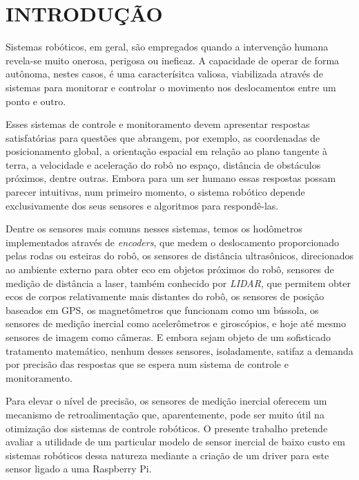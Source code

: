 \chapter*{INTRODUÇÃO}

Sistemas robóticos, em geral, são empregados quando a intervenção humana
revela-se muito onerosa, perigosa ou ineficaz. A capacidade de operar de forma
autônoma, nestes casos, é uma caracterísitca valiosa, viabilizada através de
sistemas para monitorar e controlar o movimento nos deslocamentos entre um
ponto e outro.

Esses sistemas de controle e monitoramento devem apresentar respostas
satisfatórias para questões que abrangem, por exemplo, as coordenadas de
posicionamento global, a orientação espacial em relação ao plano tangente à
terra, a velocidade e aceleração do robô no espaço, distância de obstáculos
próximos, dentre outras. Embora para um ser humano essas respostas possam
parecer intuitivas, num primeiro momento, o sistema robótico depende
exclusivamente dos seus sensores e algoritmos para respondê-las.

Dentre os sensores mais comuns nesses sistemas, temos os hodômetros
implementados através de \emph{encoders}, que medem o deslocamento
proporcionado pelas rodas ou esteiras do robô, os sensores de distância
ultrasônicos, direcionados ao ambiente externo para obter eco em objetos
próximos do robô, sensores de medição de distância a laser, também conhecido
por \emph{LIDAR}, que permitem obter ecos de corpos relativamente mais
distantes do robô, os sensores de posição baseados em GPS, os magnetômetros que
funcionam como um bússola, os sensores de medição inercial como acelerômetros e
giroscópios, e hoje até mesmo sensores de imagem como câmeras. E embora sejam
objeto de um sofisticado tratamento matemático, nenhum desses sensores,
isoladamente, satifaz a demanda por precisão das respostas que se espera num
sistema de controle e monitoramento.

Para elevar o nível de precisão, os sensores de medição inercial oferecem um
mecanismo de retroalimentação que, aparentemente, pode ser muito útil na
otimização dos sistemas de controle robóticos. O presente trabalho pretende
avaliar a utilidade de um particular modelo de sensor inercial de baixo custo
em sistemas robóticos dessa natureza mediante a criação de um driver para este
sensor ligado a uma Raspberry Pi.

